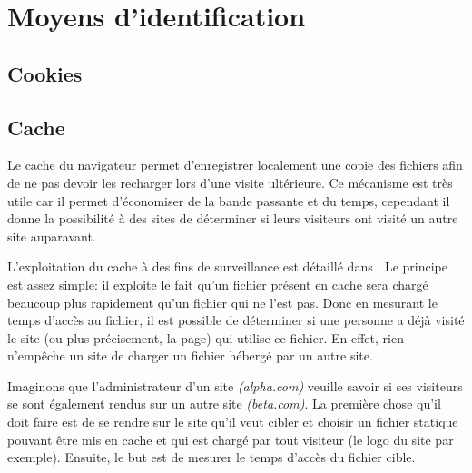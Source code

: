 \chapter{Moyens d'identification}
\section{Cookies}
\section{Cache}
Le cache du navigateur permet d'enregistrer localement une copie des fichiers afin de ne pas devoir les recharger lors d'une visite ultérieure. Ce mécanisme est très utile car il permet d'économiser de la bande passante et du temps, cependant il donne la possibilité à des sites de déterminer si leurs visiteurs ont visité un autre site auparavant.

L'exploitation du cache à des fins de surveillance est détaillé dans \cite{Felten:2000:TAW:352600.352606}.
Le principe est assez simple: il exploite le fait qu'un fichier présent en cache sera chargé beaucoup plus rapidement qu'un fichier qui ne l'est pas. Donc en mesurant le temps d'accès au fichier, il est possible de déterminer si une personne a déjà visité le site (ou plus précisement, la page) qui utilise ce fichier. En effet, rien n'empêche un site de charger un fichier hébergé par un autre site.
\newline

Imaginons que l'administrateur d'un site \emph{(alpha.com)} veuille savoir si ses visiteurs se sont également rendus sur un autre site \emph{(beta.com)}. La première chose qu'il doit faire est de se rendre sur le site qu'il veut cibler et choisir un fichier statique pouvant être mis en cache et qui est chargé par tout visiteur (le logo du site par exemple). Ensuite, le but est de mesurer le temps d'accès du fichier cible.


